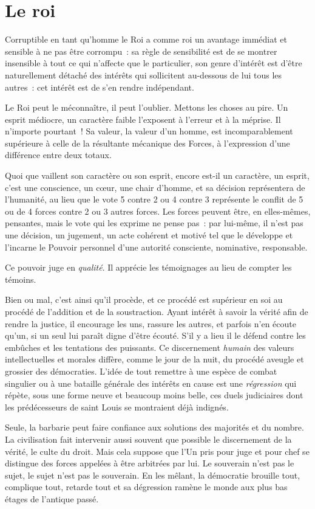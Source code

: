\documentclass[french,twoside]{book} %
\newcommand{\astermono}{\medskip\centerline{\color{rubric}\large\selectfont{\syms ✻}}\medskip\par}%
\begin{document}
\section[Le roi]{Le roi}
\noindent Corruptible en tant qu’homme le Roi a comme roi un avantage immédiat et sensible à ne pas être corrompu : sa règle de sensibilité est de se montrer insensible à tout ce qui n’affecte que le particulier, son genre d’intérêt est d’être naturellement détaché des intérêts qui sollicitent au-dessous de lui tous les autres : cet intérêt est de s’en rendre indépendant.\par
Le Roi peut le méconnaître, il peut l’oublier. Mettons les choses au pire. Un esprit médiocre, un caractère faible l’exposent à l’erreur et à la méprise. Il n’importe pourtant ! Sa valeur, la valeur d’un homme, est incomparablement supérieure à celle de la résultante mécanique des Forces, à l’expression d’une différence entre deux totaux.\par
Quoi que vaillent son caractère ou son esprit, encore est-il un caractère, un esprit, c’est une conscience, un cœur, une chair d’homme, et sa décision représentera de l’humanité, au lieu que le vote 5 contre 2 ou 4 contre 3 représente le conflit de 5 ou de 4 forces contre 2 ou 3 autres forces. Les forces peuvent être, en elles-mêmes, pensantes, mais le vote qui les exprime ne pense pas : par lui-même, il n’est pas une décision, un jugement, un acte cohérent et motivé tel que le développe et l’incarne le Pouvoir personnel d’une autorité consciente, nominative, responsable.\par

\astermono

\noindent Ce pouvoir juge en \emph{qualité}. Il apprécie les témoignages au lieu de compter les témoins.\par
Bien ou mal, c’est ainsi qu’il procède, et ce procédé est supérieur en soi au procédé de l’addition et de la soustraction. Ayant intérêt à savoir la vérité afin de rendre la justice, il encourage les uns, rassure les autres, et parfois n’en écoute qu’un, si un seul lui paraît digne d’être écouté. S’il y a lieu il le défend contre les embûches et les tentations des puissants. Ce discernement \emph{humain} des valeurs intellectuelles et morales diffère, comme le jour de la nuit, du procédé aveugle et grossier des démocraties. L’idée de tout remettre à une espèce de combat singulier ou à une bataille générale des intérêts en cause est une \emph{régression} qui répète, sous une forme neuve et beaucoup moins belle, ces duels judiciaires dont les prédécesseurs de saint Louis se montraient déjà indignés.\par
Seule, la barbarie peut faire confiance aux solutions des majorités et du nombre. La civilisation fait intervenir aussi souvent que possible le discernement de la vérité, le culte du droit. Mais cela suppose que l’Un pris pour juge et pour chef se distingue des forces appelées à être arbitrées par lui. Le souverain n’est pas le sujet, le sujet n’est pas le souverain. En les mêlant, la démocratie brouille tout, complique tout, retarde tout et sa dégression ramène le monde aux plus bas étages de l’antique passé.\par
\end{document}
